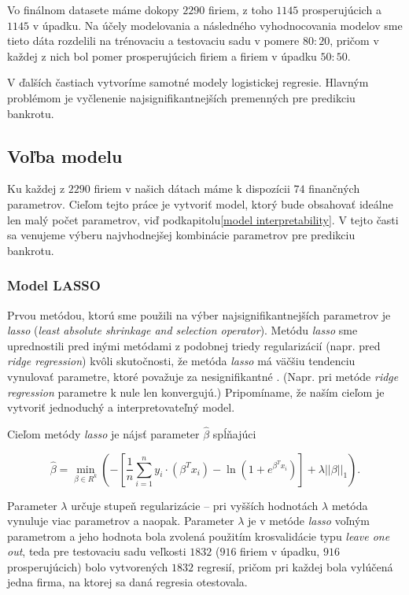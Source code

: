 Vo finálnom datasete máme dokopy \(2290\) firiem, z toho \(1145\) prosperujúcich a \(1145\) v úpadku.
Na účely modelovania a následného vyhodnocovania modelov sme tieto dáta rozdelili na trénovaciu a testovaciu sadu v pomere \(80:20\),
pričom v každej z nich bol pomer prosperujúcich firiem a firiem v úpadku \(50:50\).

V ďalších častiach vytvoríme samotné modely logistickej regresie. Hlavným problémom je vyčlenenie najsignifikantnejších premenných pre predikciu bankrotu.

\subsection{Voľba modelu}

Ku každej z \(2290\) firiem v našich dátach máme k dispozícii \(74\) finančných parametrov.
Cieľom tejto práce je vytvoriť model, ktorý bude obsahovať ideálne len malý počet parametrov, viď podkapitolu\autoref{model interpretability}.
V tejto časti sa venujeme výberu najvhodnejšej kombinácie parametrov pre predikciu bankrotu.

\subsubsection{Model LASSO}

Prvou metódou, ktorú sme použili na výber najsignifikantnejších parametrov je \emph{lasso} (\emph{least absolute shrinkage and selection operator}).
Metódu \emph{lasso} sme uprednostili pred inými metódami z podobnej triedy regularizácií (napr. pred \emph{ridge regression}) kvôli skutočnosti,
že metóda \emph{lasso} má väčšiu tendenciu vynulovať parametre, ktoré považuje za nesignifikantné \cite{glmnet}.
(Napr. pri metóde \emph{ridge regression} parametre k nule len konvergujú.)
Pripomíname, že naším cieľom je vytvoriť jednoduchý a interpretovateľný model.

Cieľom metódy \emph{lasso} je nájsť parameter \(\hat{\beta}\) spĺňajúci

\[
    \hat{\beta} = \min_{\beta \in R^k} \left( - \left[ \frac{1}{n} \sum_{i = 1}^n y_i \cdot (\beta^T x_i) - \ln{(1 + e^{\beta^T x_i})} \right] + \lambda || \beta ||_1 \right).
\]

Parameter \(\lambda\) určuje stupeň regularizácie – pri vyšších hodnotách \(\lambda\) metóda vynuluje viac parametrov a naopak.
Parameter \(\lambda\) je v metóde \emph{lasso} voľným parametrom a jeho hodnota bola zvolená použitím krosvalidácie typu \emph{leave one out},
teda pre testovaciu sadu veľkosti \(1832\) (\(916\) firiem v úpadku, \(916\) prosperujúcich) bolo vytvorených \(1832\) regresií,
pričom pri každej bola vylúčená jedna firma, na ktorej sa daná regresia otestovala.

